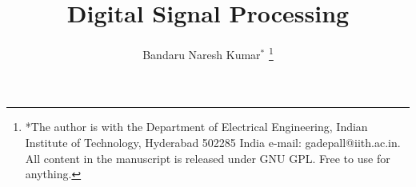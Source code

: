 \documentclass[journal,12pt,twocolumn]{IEEEtran}
\numberwithin{equation}{section}
\begin{document}

\def\putbox#1#2#3{\makebox[0in][l]{\makebox[#1][l]{}\raisebox{\baselineskip}[0in][0in]{\raisebox{#2}[0in][0in]{#3}}}}
     \def\rightbox#1{\makebox[0in][r]{#1}}
     \def\centbox#1{\makebox[0in]{#1}}
     \def\topbox#1{\raisebox{-\baselineskip}[0in][0in]{#1}}
     \def\midbox#1{\raisebox{-0.5\baselineskip}[0in][0in]{#1}}

\vspace{3cm}

\title{ 
Digital Signal Processing
}


%
%
%

\author{ Bandaru Naresh Kumar$^{*}$ %
\thanks{*The author is with the Department
of Electrical Engineering, Indian Institute of Technology, Hyderabad
502285 India e-mail:  gadepall@iith.ac.in.  All content in the manuscript is 
released under GNU GPL.  Free to use for anything. }%
}
% 
%
\end{document}
